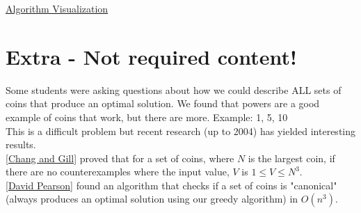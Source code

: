 \documentclass[pdf]{article}
\begin{document}
\href{https://visualgo.net/en/mst}{Algorithm Visualization}

\section{Extra - Not required content!}
Some students were asking questions about how we could describe ALL sets of coins that produce an optimal solution. We found that powers are a good example of coins that work, but there are more. Example: 1, 5, 10\\
This is a difficult problem but recent research (up to 2004) has yielded interesting results.\\
\href{http://dl.acm.org/citation.cfm?id=321567}{[Chang and Gill]} proved that for a set of coins, where $N$ is the largest coin, if there are no counterexamples where the input value, $V$ is $1 \leq V \leq N^3$.\\
\href{http://dl.acm.org/citation.cfm?id=2309414}{[David Pearson]} found an algorithm that checks if a set of coins is "canonical" (always produces an optimal solution using our greedy algorithm) in $O(n^3)$.
\end{document}
